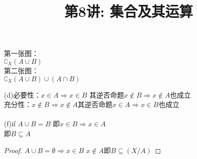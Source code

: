 \documentclass[a4paper, justified]{tufte-handout}
\title{第8讲: 集合及其运算}
\date{\zhtoday} %
\begin{document}
\maketitle
\noplagiarism %
\begin{abstract}
  \begin{center}{}
  \end{center}
\end{abstract}
\beginrequired

\begin{problem}[UD Problem 6.6 (f, g)]
\end{problem}

\begin{solution}
  第一张图：\\
  $\complement_X(A\cup B)$\\
  第二张图：\\
  $\complement_X(A\cup B) \cup (A\cap B) $
\end{solution}

\begin{problem}[UD Problem 7.1 (d, f)]
\end{problem}


\begin{solution}
  \noindent(d)必要性：$x\in A \Rightarrow x\in B$
  其逆否命题$x\notin B \Rightarrow x\notin A$也成立\\
  充分性：$x\notin B \Rightarrow x\notin A$其逆否命题$x\in A \Rightarrow x\in B$也成立\\
  \\
  (f)if $A \cup B = B$
  即$x\in B \Rightarrow x\in A$ \\
  即$B \subseteq A$
\end{solution}

\begin{problem}[UD Problem 7.2]
\end{problem}

\begin{proof}
  $A \cup B = \emptyset \Rightarrow x\in B$ $x \notin A$即$B \subseteq (X / A)$
\end{proof}
\end{document}
